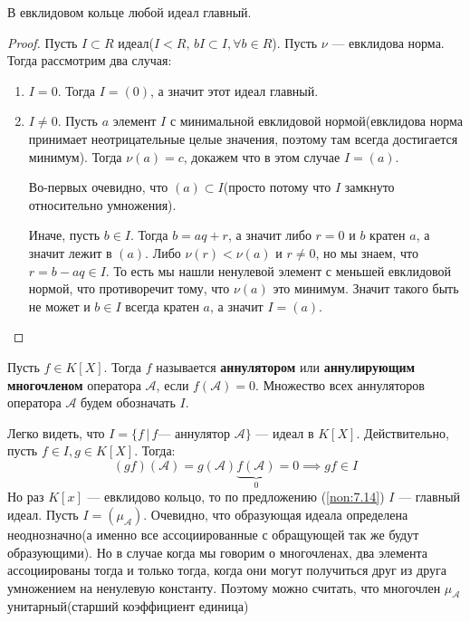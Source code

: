 \documentclass[../main.tex]{subfiles}
\begin{document}
\begin{theorem-non}
\label{non:7.14}
  В евклидовом кольце любой идеал главный.
\end{theorem-non}
\begin{proof}
  Пусть $I \subset R$ идеал($I < R,\, bI \subset I, \forall b \in R$). Пусть $\nu$ --- евклидова норма. Тогда рассмотрим два случая:
  \begin{enumerate}
    \item $I = 0$. Тогда $I = (0)$, а значит этот идеал главный.
    \item $I \neq 0$. Пусть $a$ элемент $I$ с минимальной евклидовой нормой(евклидова норма принимает неотрицательные целые значения, поэтому там всегда достигается минимум). Тогда $\nu(a) = c$, докажем что в этом случае $I = (a)$.

    Во-первых очевидно, что $(a) \subset I$(просто потому что $I$ замкнуто относительно умножения).

    Иначе, пусть $b \in I$. Тогда $b = aq + r$, а значит либо $r = 0$ и $b$ кратен $a$, а значит лежит в $(a)$. Либо $\nu(r) < \nu(a)$ и $r \neq 0$, но мы знаем, что $r = b - aq \in I$. То есть мы нашли ненулевой элемент с меньшей евклидовой нормой, что противоречит тому, что $\nu(a)$ это минимум. Значит такого быть не может и $b \in I$ всегда кратен $a$, а значит $I = (a)$.
  \end{enumerate}
\end{proof}
\begin{definition}
  Пусть $f \in K[X]$. Тогда $f$ называется \textbf{аннулятором} или \textbf{аннулирующим многочленом} оператора $\mathcal{A}$, если $f(\mathcal{A}) = 0$. Множество всех аннуляторов оператора $\mathcal{A}$ будем обозначать $I$.
\end{definition}
Легко видеть, что $I = \{f \, | \, f\text{--- аннулятор $\mathcal{A}$}\}$ --- идеал в $K[X]$. Действительно, пусть $f \in I, g \in K[X]$. Тогда:
\begin{equation*}
  (gf)(\mathcal{A}) = g(\mathcal{A})\underbrace{f(\mathcal{A})}_{0} = 0 \implies gf \in I
\end{equation*}
Но раз $K[x]$ --- евклидово кольцо, то по предложению (\ref{non:7.14}) $I$ --- главный идеал. Пусть $I = (\mu_{\mathcal{A}})$. Очевидно, что образующая идеала определена неоднозначно(а именно все ассоциированные с обращующей так же будут образующими). Но в случае когда мы говорим о многочленах, два элемента ассоциированы тогда и только тогда, когда они могут получиться друг из друга умножением на ненулевую константу. Поэтому можно считать, что многочлен $\mu_{\mathcal{A}}$ унитарный(старший коэффициент единица)
\end{document}
